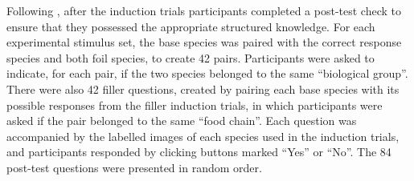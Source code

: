 Following \citet{Bright},
after the induction trials participants completed
a post-test check to ensure that they
possessed the appropriate structured knowledge.
For each experimental stimulus set,
the base species was paired with the correct response species
and both foil species, to create 42 pairs.
Participants were asked to indicate, for each pair,
if the two species belonged to the same ``biological group''.
There were also 42 filler questions,
created by pairing each base species
with its possible responses from the filler induction trials,
in which participants were asked if the pair
belonged to the same ``food chain''.
Each question was accompanied by the labelled images
of each species used in the induction trials,
and participants responded by clicking buttons
marked ``Yes'' or ``No''.
The 84 post-test questions were presented in random order.
